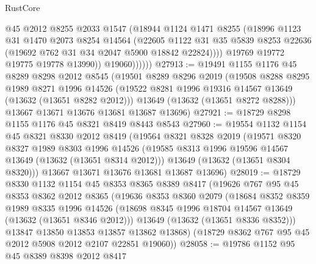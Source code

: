 \begin{lexlean}{RustCore}
\begin{coremodule}
                    @45
                    @2012
                    @8255
                    @2033
                    @1547
                    (@18944
                      @1124
                      @1471
                      @8255
                      (@18996
                        @1123
                        @31
                        @1470
                        @2073
                        @8254
                        @14564
                        (@22605
                          @1122
                          @31
                          @35
                          @5839
                          @8253
                          @22636
                          (@19692 @762 @31 @34 @2047 @5900 @18842 @22824))))
                    @19769
                    @19772
                    @19775
                    @19778
                    @13990))
                @19060))))))
@27913 := @19491
    @1155
    @1176
    @45
    @8289
    @8298
    @2012
    @8545
    (@19501
      @8289
      @8296
      @2019
      (@19508
        @8288
        @8295
        @1989
        @8271
        @1996
        @14526
        (@19522 @8281 @1996 @19316 @14567 @13649 (@13632 (@13651 @8282 @2012)))
        @13649
        (@13632 (@13651 @8272 @8288)))
      @13667
      @13671
      @13676
      @13681
      @13687
      @13696)
@27921 := @18729 @8298 @1155 @1176 @45 @8321 @8419 @8443 @8543
@27960 := @19554
    @1132
    @1154
    @45
    @8321
    @8330
    @2012
    @8419
    (@19564
      @8321
      @8328
      @2019
      (@19571
        @8320
        @8327
        @1989
        @8303
        @1996
        @14526
        (@19585 @8313 @1996 @19596 @14567 @13649 (@13632 (@13651 @8314 @2012)))
        @13649
        (@13632 (@13651 @8304 @8320)))
      @13667
      @13671
      @13676
      @13681
      @13687
      @13696)
@28019 := @18729
    @8330
    @1132
    @1154
    @45
    @8353
    @8365
    @8389
    @8417
    (@19626
      @767
      @95
      @45
      @8353
      @8362
      @2012
      @8365
      (@19636
        @8353
        @8360
        @2079
        (@18684
          @8352
          @8359
          @1989
          @8335
          @1996
          @14526
          (@18698 @8345 @1996 @18704 @14567 @13649 (@13632 (@13651 @8346 @2012)))
          @13649
          (@13632 (@13651 @8336 @8352)))
        @13847
        @13850
        @13853
        @13857
        @13862
        @13868)
      (@18729 @8362 @767 @95 @45 @2012 @5908 @2012 @2107 @22851 @19060))
@28058 := @19786
    @1152
    @95
    @45
    @8389
    @8398
    @2012
    @8417

\end{coremodule}
\end{lexlean}
